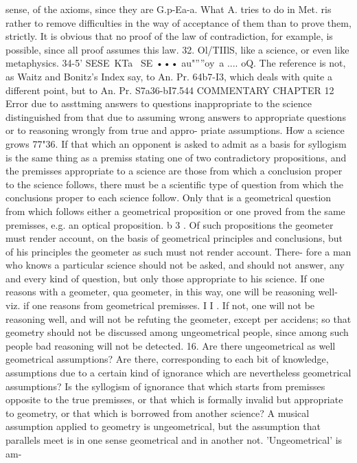 {{{{{{{{{{{{sense, of the axioms, since they are G.p-Ea-a. What A. tries to do
in Met. ris rather to remove difficulties in the way of acceptance
of them than to prove them, strictly. It is obvious that no proof
of the law of contradiction, for example, is possible, since all
proof assumes this law.
32. Ol/TIIlS, like a science, or even like metaphysics.
34-5' SESE~KTa~ SE ••• au"''''oy~a .... oQ. The reference is not, as
Waitz and Bonitz's Index say, to An. Pr. 64b7-I3, which deals
with quite a different point, but to An. Pr. S7a36-bI7.544
COMMENTARY
CHAPTER 12
Error due to assttming answers to questions inappropriate to the
science distinguished from that due to assuming wrong answers to
appropriate questions or to reasoning wrongly from true and appro-
priate assumptions. How a science grows
77"36. If that which an opponent is asked to admit as a basis
for syllogism is the same thing as a premiss stating one of two
contradictory propositions, and the premisses appropriate to a
science are those from which a conclusion proper to the science
follows, there must be a scientific type of question from which
the conclusions proper to each science follow. Only that is a
geometrical question from which follows either a geometrical
proposition or one proved from the same premisses, e.g. an optical
proposition.
b 3 . Of such propositions the geometer must render account, on
the basis of geometrical principles and conclusions, but of his
principles the geometer as such must not render account. There-
fore a man who knows a particular science should not be asked,
and should not answer, any and every kind of question, but only
those appropriate to his science. If one reasons with a geometer,
qua geometer, in this way, one will be reasoning well-viz. if one
reasons from geometrical premisses.
I I . If not, one will not be reasoning well, and will not be
refuting the geometer, except per accidens; so that geometry
should not be discussed among ungeometrical people, since among
such people bad reasoning will not be detected.
16. Are there ungeometrical as well geometrical assumptions?
Are there, corresponding to each bit of knowledge, assumptions due
to a certain kind of ignorance which are nevertheless geometrical
assumptions? Is the syllogism of ignorance that which starts from
premisses opposite to the true premisses, or that which is formally
invalid but appropriate to geometry, or that which is borrowed from
another science? A musical assumption applied to geometry is
ungeometrical, but the assumption that parallels meet is in one
sense geometrical and in another not. 'Ungeometrical' is am-
}}}}}}}}}}}}
